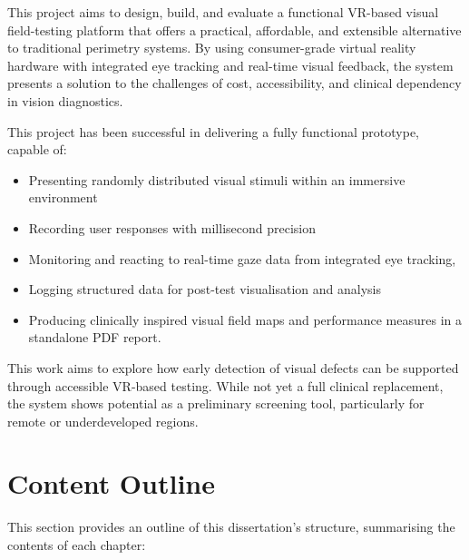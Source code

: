 \documentclass{l4proj}
\begin{document}
This project aims to design, build, and evaluate a functional VR-based visual field-testing platform that offers a practical, affordable, and extensible alternative to traditional perimetry systems. By using consumer-grade virtual reality hardware with integrated eye tracking and real-time visual feedback, the system presents a solution to the challenges of cost, accessibility, and clinical dependency in vision diagnostics. 

This project has been successful in delivering a fully functional prototype, capable of: 

\begin{itemize}
    \item Presenting randomly distributed visual stimuli within an immersive environment
    \item Recording user responses with millisecond precision
    \item Monitoring and reacting to real-time gaze data from integrated eye tracking,
    \item Logging structured data for post-test visualisation and analysis
    \item Producing clinically inspired visual field maps and performance measures in a standalone PDF report.
\end{itemize}

This work aims to explore how early detection of visual defects can be supported through accessible VR-based testing. While not yet a full clinical replacement, the system shows potential as a preliminary screening tool, particularly for remote or underdeveloped regions. 


\section{Content Outline}

This section provides an outline of this dissertation’s structure, summarising the contents of each chapter: \newline
\end{document}
